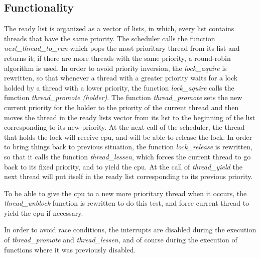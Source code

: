     \subsection{Functionality}

	The ready list is organized as a vector of lists, in which, every list contains threads that have the same priority. The scheduler calls the function \textit{next\_thread\_to\_run} which pops the most prioritary thread from its list and returns it; if there are more threads with the same priority, a round-robin algorithm is used. In order to avoid priority inversion, the \textit{lock\_aquire} is rewritten, so that whenever a thread with a greater priority waits for a lock holded by a thread with a lower priority, the function \textit{lock\_aquire} calls the function \textit{thread\_promote (holder)}. The function \textit{thread\_promote} sets the new current priority  for the holder to the priority of the current thread and then moves the thread in the ready lists vector from its list to the beginning of the list corresponding to its new priority. At the next call of the scheduler, the thread that holds the lock will receive cpu, and will be able to release the lock. In order to bring things back to previous situation, the function \textit{lock\_release} is rewritten, so that it calls the function \textit{thread\_lessen}, which forces the current thread to go back to its fixed priority, and to yield the cpu. At the call of \textit{thread\_yield} the next thread will put itself in the ready list corresponding to its previous priority. 

	To be able to give the cpu to a new more prioritary thread when it occurs, the \textit{thread\_unblock} function is rewritten to do this test, and force current thread to yield the cpu if necessary.

	In order to avoid race conditions, the interrupts are disabled during the execution of \textit{thread\_promote} and \textit{thread\_lessen}, and of course during the execution of functions where it was previously disabled.




